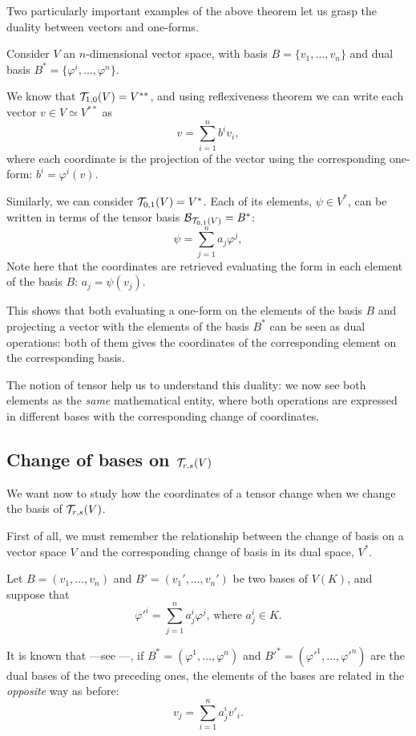 Two particularly important examples of the above theorem let us grasp the duality between vectors and one-forms.

Consider $V$ an $n$-dimensional vector space, with basis $B = \{v_1, \dots, v_n\}$ and dual basis $B^* = \{\varphi^i, \dots, \varphi^n\}$.

We know that ${\mathcal T}_{1,0}(V) = V^{**}$, and using reflexiveness theorem we can write each vector $v \in V \simeq V^{**}$ as
\[
v = \sum_{i=1}^n b^i v_i,
\]
where each coordinate is the projection of the vector using the corresponding one-form: $b^i = \varphi^i(v)$.

Similarly, we can consider ${\mathcal T}_{0,1}(V) = V^*$. Each of its elements, $\psi \in V^*$, can be written in terms of the tensor basis $\mathcal{B}_{{\mathcal T}_{0,1}(V)} = B^*$:
\[
	\psi = \sum_{j=1}^n a_j \varphi^j,
\]
Note here that the coordinates are retrieved evaluating the form in each element of the basis $B$: $a_j = \psi(v_j)$.

This shows that both evaluating a one-form on the elements of the basis $B$ and projecting a vector with the elements of the basis $B^*$ can be seen as dual operations: both of them gives the coordinates of the corresponding element on the corresponding basis.

The notion of tensor help us to understand this duality: we now see both elements as the \emph{same} mathematical entity, where both operations are expressed in different bases with the corresponding change of coordinates.

\subsection{Change of bases on ${\mathcal T}_{r,s}(V)$}

We want now to study how the coordinates of a tensor change when we change the basis of ${\mathcal T}_{r,s}(V)$.

First of all, we must remember the relationship between the change of basis on a vector space $V$ and the corresponding change of basis in its dual space, $V^*$.

Let $B = (v_1, \dots, v_n)$ and $B' = (v_1', \dots, v_n')$ be two bases of $V(K)$, and suppose that
\begin{equation}
	\label{eq:changeV*}
	\varphi'^i = \sum_{j=1}^n a_j^i \varphi^j \textrm{, where } a_j^i \in K.
\end{equation}

It is known that ---see \cite[p. 162]{romero86}---, if $B^* = (\varphi^1, \dots, \varphi^n)$ and $B'^* = (\varphi'^1, \dots, \varphi'^n)$ are the dual bases of the two preceding ones, the elements of the bases are related in the \emph{opposite} way as before:
\[
	v_j = \sum_{i=1}^n a_j^i v'_i.
\]

